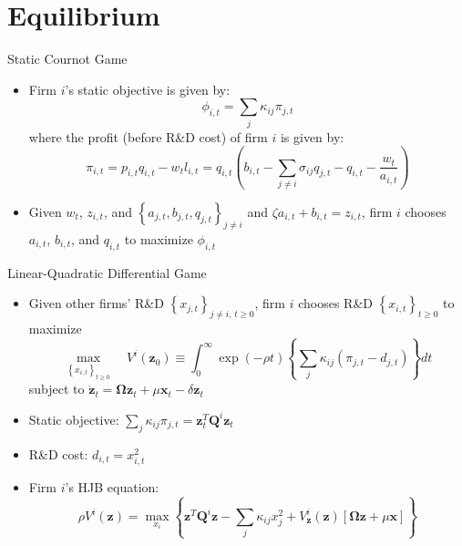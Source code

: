 \documentclass[
  10pt,
  aspectratio=169,   %
]{beamer}
\theoremstyle{plain}
\begin{document}
\section{Equilibrium}

\begin{frame}{Static Cournot Game}
  \begin{itemize}
    \item Firm $i$'s static objective is given by:
          \[
            \phi_{i,t} = \sum_{j} \kappa_{ij} \pi_{j,t}
          \]
          where the profit (before R\&D cost) of firm $i$ is given by:
          \[\pi_{i,t} = p_{i,t} q_{i,t} - w_t l_{i,t} = q_{i,t} \left( b_{i,t} - \sum_{j\neq i} \sigma_{ij} q_{j,t} - q_{i,t} - \frac{w_t}{a_{i,t}} \right)\]
    \item Given $w_t$, $z_{i,t}$, and $\left\{a_{j,t}, b_{j,t}, q_{j,t}\right\}_{j\neq i}$ and $\zeta a_{i,t} + b_{i,t} = z_{i,t}$, firm $i$ chooses $a_{i,t}$, $b_{i,t}$, and $q_{i,t}$ to maximize $\phi_{i,t}$
  \end{itemize}
  \hyperlink{static_equilibrium}{}
\end{frame}

\begin{frame}{Linear-Quadratic Differential Game}
  \begin{itemize}
    \item Given other firms' R\&D $\left\{ x_{j,t}\right\}_{j\neq i,\,t\geq0}$, firm $i$ chooses R\&D $\left\{ x_{i,t}\right\}_{t\geq0}$ to maximize
          \[
            \max_{\left\{ x_{i,t}\right\}_{t\geq0}}\quad V^{i}\left(\bm{z}_{0}\right)\equiv\int_{0}^{\infty}\exp\left(-\rho t\right)\left\{ \sum_{j}\kappa_{ij}\left(\pi_{j,t}-d_{j,t}\right)\right\} dt
          \]
          subject to $\dot{\bm{z}}_{t}=\bm{\Omega}\bm{z}_{t}+\mu\bm{x}_{t}-\delta\bm{z}_{t}$
          \pause\medskip{}
    \item Static objective: $\sum_{j}\kappa_{ij}\pi_{j,t}=\bm{z}_{t}^{T}\bm{Q}^{i}\bm{z}_{t}$ \hyperlink{Q}{} \medskip{}
    \item R\&D cost: $d_{i,t}=x_{i,t}^2$\medskip{} \pause
    \item Firm $i$'s HJB equation:
          \[
            \rho V^{i}\left(\bm{z}\right)=\max_{x_{i}}\left\{ \bm{z}^{T}\bm{Q}^{i}\bm{z}-\sum_{j}\kappa_{ij}x_{j}^{2}+V_{\bm{z}}^{i}\left(\bm{z}\right)\left[\bm{\Omega}\bm{z}+\mu\bm{x}\right]\right\}
          \]
  \end{itemize}
\end{frame}
\end{document}
